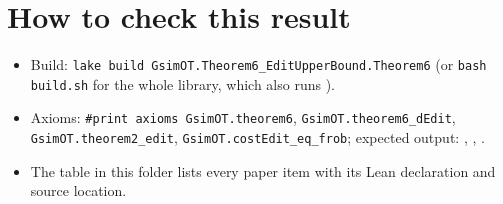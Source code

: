 \section{How to check this result}
\begin{itemize}
\item Build: \texttt{lake build GsimOT.Theorem6\_EditUpperBound.Theorem6} (or \texttt{bash build.sh} for the whole
  library, which also runs ).
\item Axioms: \texttt{\#print axioms GsimOT.theorem6}, \texttt{GsimOT.theorem6\_dEdit},
  \texttt{GsimOT.theorem2\_edit}, \texttt{GsimOT.costEdit\_eq\_frob}; expected output: ,
  , .
\item The table  in this folder lists every paper item with its Lean
  declaration and source location.
\end{itemize}

